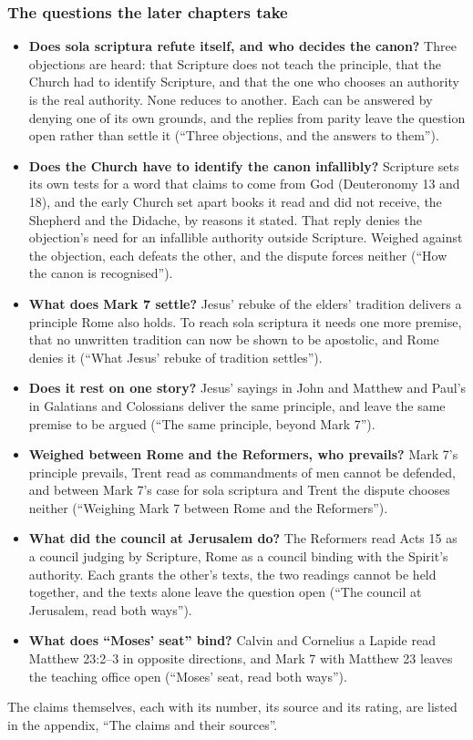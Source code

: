 \documentclass[11pt]{article}
\begin{document}
\subsubsection*{The questions the later chapters take}
\begin{itemize}
  \item \textbf{Does sola scriptura refute itself, and who decides the canon?} Three objections are heard: that Scripture does not teach the principle, that the Church had to identify Scripture, and that the one who chooses an authority is the real authority. None reduces to another. Each can be answered by denying one of its own grounds, and the replies from parity leave the question open rather than settle it (“Three objections, and the answers to them”).
  \item \textbf{Does the Church have to identify the canon infallibly?} Scripture sets its own tests for a word that claims to come from God (Deuteronomy 13 and 18), and the early Church set apart books it read and did not receive, the Shepherd and the Didache, by reasons it stated. That reply denies the objection’s need for an infallible authority outside Scripture. Weighed against the objection, each defeats the other, and the dispute forces neither (“How the canon is recognised”).
  \item \textbf{What does Mark 7 settle?} Jesus’ rebuke of the elders’ tradition delivers a principle Rome also holds. To reach sola scriptura it needs one more premise, that no unwritten tradition can now be shown to be apostolic, and Rome denies it (“What Jesus’ rebuke of tradition settles”).
  \item \textbf{Does it rest on one story?} Jesus’ sayings in John and Matthew and Paul’s in Galatians and Colossians deliver the same principle, and leave the same premise to be argued (“The same principle, beyond Mark 7”).
  \item \textbf{Weighed between Rome and the Reformers, who prevails?} Mark 7’s principle prevails, Trent read as commandments of men cannot be defended, and between Mark 7’s case for sola scriptura and Trent the dispute chooses neither (“Weighing Mark 7 between Rome and the Reformers”).
  \item \textbf{What did the council at Jerusalem do?} The Reformers read Acts 15 as a council judging by Scripture, Rome as a council binding with the Spirit’s authority. Each grants the other’s texts, the two readings cannot be held together, and the texts alone leave the question open (“The council at Jerusalem, read both ways”).
  \item \textbf{What does “Moses’ seat” bind?} Calvin and Cornelius a Lapide read Matthew 23:2–3 in opposite directions, and Mark 7 with Matthew 23 leaves the teaching office open (“Moses’ seat, read both ways”).
\end{itemize}
The claims themselves, each with its number, its source and its rating, are listed in the appendix, “The claims and their sources”.
\end{document}

